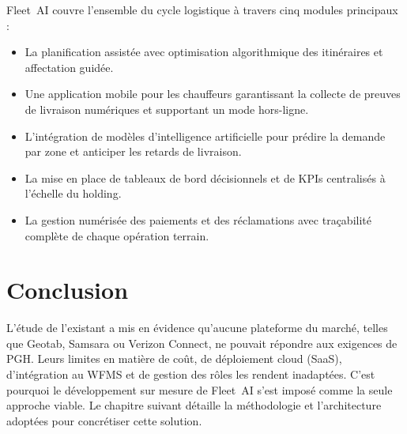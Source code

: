 Fleet~AI couvre l'ensemble du cycle logistique à travers cinq modules principaux :

\begin{itemize}
  \item La planification assistée avec optimisation algorithmique des itinéraires et affectation guidée.
  \item Une application mobile pour les chauffeurs garantissant la collecte de preuves de livraison numériques et supportant un mode hors-ligne.
  \item L'intégration de modèles d'intelligence artificielle pour prédire la demande par zone et anticiper les retards de livraison.
  \item La mise en place de tableaux de bord décisionnels et de KPIs centralisés à l'échelle du holding.
  \item La gestion numérisée des paiements et des réclamations avec traçabilité complète de chaque opération terrain.
\end{itemize}

\section*{Conclusion}
L'étude de l'existant a mis en évidence qu'aucune plateforme du marché, telles que Geotab, Samsara ou Verizon Connect, ne pouvait répondre aux exigences de PGH. Leurs limites en matière de coût, de déploiement cloud (SaaS), d'intégration au WFMS et de gestion des rôles les rendent inadaptées. C'est pourquoi le développement sur mesure de Fleet~AI s'est imposé comme la seule approche viable. Le chapitre suivant détaille la méthodologie et l'architecture adoptées pour concrétiser cette solution.
